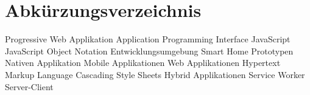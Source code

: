 \chapter*{Abkürzungsverzeichnis}
\pagestyle{plain}

\begin{acronym}[AUTOSAR]

   				{Progressive Web Applikation}
  				{Application Programming Interface}
  				{JavaScript}
  				{JavaScript Object Notation}
  				{Entwicklungsumgebung}
  				{Smart Home Prototypen}
  				{Nativen Applikation}
  				{Mobile Applikationen}
 			{Web Applikationen}
 				{Hypertext Markup Language}
 				{Cascading Style Sheets}
 			{Hybrid Applikationen}
 					{Service Worker}
 					{Server-Client}
\end{acronym}